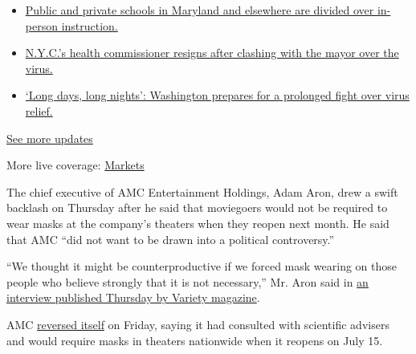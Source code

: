 \begin{itemize}
\tightlist
\item
  \href{https://www.nytimes3xbfgragh.onion/2020/08/04/world/coronavirus-cases.html?action=click\&pgtype=Article\&state=default\&region=MAIN_CONTENT_1\&context=storylines_live_updates\#link-4825b93}{Public
  and private schools in Maryland and elsewhere are divided over
  in-person instruction.}
\item
  \href{https://www.nytimes3xbfgragh.onion/2020/08/04/world/coronavirus-cases.html?action=click\&pgtype=Article\&state=default\&region=MAIN_CONTENT_1\&context=storylines_live_updates\#link-4d1eafa8}{N.Y.C.'s
  health commissioner resigns after clashing with the mayor over the
  virus.}
\item
  \href{https://www.nytimes3xbfgragh.onion/2020/08/04/world/coronavirus-cases.html?action=click\&pgtype=Article\&state=default\&region=MAIN_CONTENT_1\&context=storylines_live_updates\#link-6b644638}{`Long
  days, long nights': Washington prepares for a prolonged fight over
  virus relief.}
\end{itemize}

\href{https://www.nytimes3xbfgragh.onion/2020/08/04/world/coronavirus-cases.html?action=click\&pgtype=Article\&state=default\&region=MAIN_CONTENT_1\&context=storylines_live_updates}{See
more updates}

More live coverage:
\href{https://www.nytimes3xbfgragh.onion/live/2020/08/04/business/stock-market-today-coronavirus?action=click\&pgtype=Article\&state=default\&region=MAIN_CONTENT_1\&context=storylines_live_updates}{Markets}

The chief executive of AMC Entertainment Holdings, Adam Aron, drew a
swift backlash on Thursday after he said that moviegoers would not be
required to wear masks at the company's theaters when they reopen next
month. He said that AMC ``did not want to be drawn into a political
controversy.''

``We thought it might be counterproductive if we forced mask wearing on
those people who believe strongly that it is not necessary,'' Mr. Aron
said in
\href{https://variety.com/2020/film/news/amc-coronavirus-movie-theaters-covid-19-1234642047/}{an
interview published Thursday by Variety magazine}.

AMC
\href{https://www.nytimes3xbfgragh.onion/2020/06/18/business/AMC-theaters-masks-coronavirus.html}{reversed
itself} on Friday, saying it had consulted with scientific advisers and
would require masks in theaters nationwide when it reopens on July 15.

